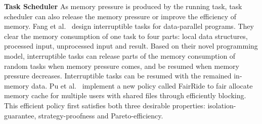\textbf{Task Scheduler} As memory pressure is produced by the running task, task scheduler can also release the memory pressure or improve the efficiency of memory. Fang et al.~\cite{fang2015interruptible} design interruptible tasks for data-parallel programs. They clear the memory consumption of one task to four parts: local data structures, processed input, unprocessed input and result. Based on their novel programming model, interruptible tasks can release parts of the memory consumption of random tasks when memory pressure comes, and be resumed when memory pressure decreases. Interruptible tasks can be resumed with the remained in-memory data. Pu et al.~\cite{pu2016fairride} implement a new policy called FairRide to fair allocate memory cache for multiple users with shared files through efficiently blocking. This efficient policy first satisfies both three desirable properties: isolation-guarantee, strategy-proofness and Pareto-efficiency.
